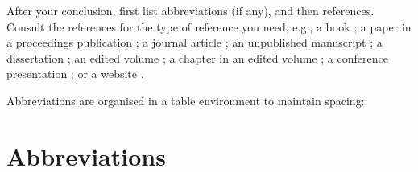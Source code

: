 After your conclusion, first list abbreviations (if any), and then references. Consult the references for the type of reference you need, e.g., a book \autocite{anderson2007munda}; a paper in a proceedings publication \autocite{delancey2002bodic}; a journal article \autocites{haokip2012thadou, peterson1998lai}; an unpublished manuscript \autocite{hyslop2010kurtop}; a dissertation \autocite{hyslop2011kurtop}; an edited volume \autocite{morey2008neil}; a chapter in an edited volume \autocite{peterson2003lai}; a conference presentation \autocite{post2008tani}; or a website \autocite{sadokpam2008meetei}.

Abbreviations are organised in a table environment to maintain spacing:

\section*{Abbreviations}



\listabbreviations



